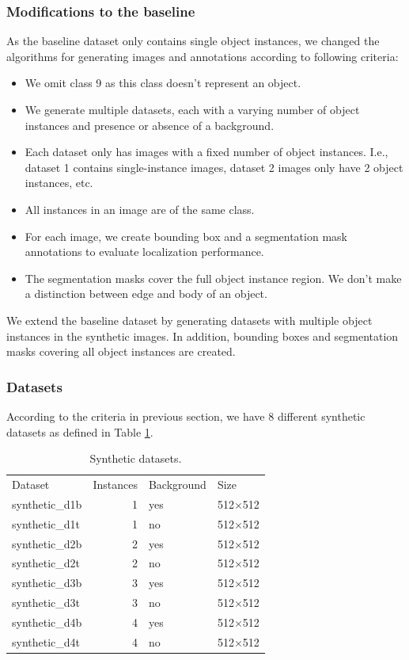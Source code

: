 \subsubsection{Modifications to the baseline}
As the baseline dataset only contains single object instances, we changed the algorithms for generating images and annotations according to following criteria:
\begin{itemize}
    \item We omit class 9 as this class doesn't represent an object.
    \item We generate multiple datasets, each with a varying number of object instances and presence or absence of a background.
    \item Each dataset only has images with a fixed number of object instances. I.e., dataset 1 contains single-instance images, dataset 2 images only have 2 object instances, etc.
    \item All instances in an image are of the same class.
    \item For each image, we create bounding box and a segmentation mask annotations to evaluate localization performance.
    \item The segmentation masks cover the full object instance region. We don't make a distinction between edge and body of an object.
\end{itemize}
We extend the baseline dataset by generating datasets with multiple object instances in the synthetic images. In addition, bounding boxes and segmentation masks covering all object instances are created.

\subsubsection{Datasets}
According to the criteria in previous section, we have 8 different synthetic datasets as defined in Table \ref{tab:synthetic_datasets}.
\begin{table}[ht]
\centering
\begin{tabular}{lrll}
  \toprule
  Dataset & Instances & Background & Size\\
  \cmidrule(lr){1-4}
  synthetic\_d1b & 1 & yes & 512$\times$512\\
  synthetic\_d1t & 1 & no & 512$\times$512\\
  synthetic\_d2b & 2 & yes & 512$\times$512\\
  synthetic\_d2t & 2 & no & 512$\times$512\\
  synthetic\_d3b & 3 & yes & 512$\times$512\\
  synthetic\_d3t & 3 & no & 512$\times$512\\
  synthetic\_d4b & 4 & yes & 512$\times$512\\
  synthetic\_d4t & 4 & no & 512$\times$512\\
  \bottomrule
\end{tabular}
\caption[Synthetic datasets]{Synthetic datasets.}
\label{tab:synthetic_datasets}
\end{table}

